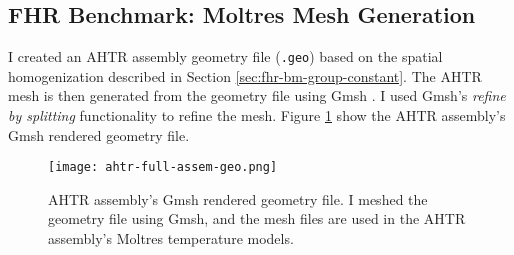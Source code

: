 \subsection{FHR Benchmark: Moltres Mesh Generation}
I created an \gls{AHTR} assembly geometry file (\texttt{.geo}) based on the spatial 
homogenization described in Section \ref{sec:fhr-bm-group-constant}.
The \gls{AHTR} mesh is then generated from the geometry file using Gmsh 
\cite{geuzaine_gmsh_2009}.
I used Gmsh's \textit{refine by splitting} functionality to refine the mesh.
Figure \ref{fig:ahtr-full-assem-geo} show the \gls{AHTR} assembly's Gmsh rendered 
geometry file.
\begin{figure}[htbp]
    \centering
    \texttt{[image: ahtr-full-assem-geo.png]}
    \caption{\acrfull{AHTR} assembly's Gmsh rendered geometry file. 
    I meshed the geometry file using Gmsh, and the mesh files are used in the \gls{AHTR} 
    assembly's Moltres temperature models.}
    \label{fig:ahtr-full-assem-geo}
\end{figure}

\pagebreak
